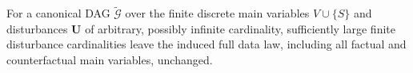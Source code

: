 For a canonical DAG \(\widetilde{\mathcal G}\) over the finite discrete main variables \(V\cup\{S\}\) and disturbances \(\mathbf U\) of arbitrary, possibly infinite cardinality, sufficiently large finite disturbance cardinalities leave the induced full data law, including all factual and counterfactual main variables, unchanged.